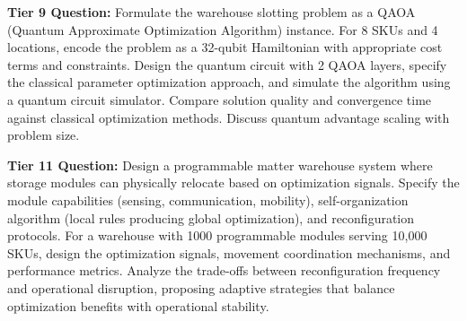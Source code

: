 \documentclass{article}
\begin{document}
\textbf{Tier 9 Question:} Formulate the warehouse slotting problem as a QAOA (Quantum Approximate Optimization Algorithm) instance. For 8 SKUs and 4 locations, encode the problem as a 32-qubit Hamiltonian with appropriate cost terms and constraints. Design the quantum circuit with 2 QAOA layers, specify the classical parameter optimization approach, and simulate the algorithm using a quantum circuit simulator. Compare solution quality and convergence time against classical optimization methods. Discuss quantum advantage scaling with problem size.

\textbf{Tier 11 Question:} Design a programmable matter warehouse system where storage modules can physically relocate based on optimization signals. Specify the module capabilities (sensing, communication, mobility), self-organization algorithm (local rules producing global optimization), and reconfiguration protocols. For a warehouse with 1000 programmable modules serving 10,000 SKUs, design the optimization signals, movement coordination mechanisms, and performance metrics. Analyze the trade-offs between reconfiguration frequency and operational disruption, proposing adaptive strategies that balance optimization benefits with operational stability.
\end{document}
